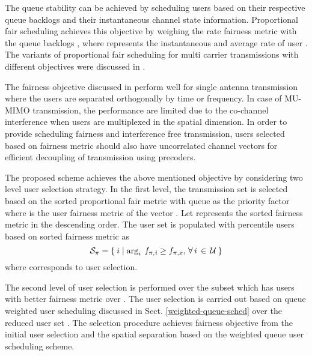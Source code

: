 
The queue stability can be achieved by scheduling users based on their respective queue backlogs and their instantaneous channel state information. Proportional fair scheduling achieves this objective by weighing the rate fairness metric  with the queue backlogs , where  represents the instantaneous and average rate of user . The variants of proportional fair scheduling for multi carrier transmissions with different objectives were discussed in \cite{adaptation_crosslayer}.

The fairness objective discussed in \cite{adaptation_crosslayer} perform well for single antenna transmission where the users are separated orthogonally by time or frequency. In case of MU-MIMO transmission, the performance are limited due to the co-channel interference when users are multiplexed in the spatial dimension. In order to provide scheduling fairness and interference free transmission, users selected based on fairness metric should also have uncorrelated channel vectors for efficient decoupling of transmission using precoders.

The proposed scheme achieves the above mentioned objective by considering two level user selection strategy. In the first level, the transmission set  is selected based on the sorted proportional fair metric with queue as the priority factor  where  is the  user fairness metric of the vector . Let  represents the sorted fairness metric in the descending order. The user set  is populated with  percentile users based on sorted fairness metric  as
\begin{equation}
\mathcal{S}_\pi = \left \lbrace \: i \mid \arg_i \: {f}_{\mathit{\pi},\mathit{i}} \geq {f}_{\mathit{\pi},\mathit{x}}, \, \forall \, i \, \in \, \mathcal{U} \: \right \rbrace
\label{qba2-e1}
\end{equation}
where  corresponds to  user selection.

The second level of user selection is performed over the subset  which has users with better fairness metric over . The user selection is carried out based on queue weighted user scheduling discussed in Sect. \ref{weighted-queue-sched} over the reduced user set . The selection procedure achieves fairness objective from the initial user selection and the spatial separation based on the weighted queue user scheduling scheme.
